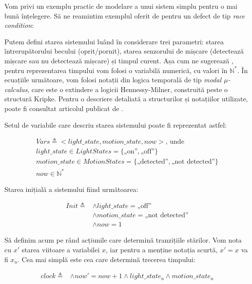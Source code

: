 Vom privi un exemplu practic de modelare a unui sistem simplu pentru o mai bună înțelegere. Să ne reamintim exemplul oferit de \citet{Zhou2021} pentru un defect de tip \textit{race condition}:


Putem defini starea sistemului luând în considerare trei parametri: starea întrerupătorului becului (oprit/pornit), starea senzorului de mișcare (detectează mișcare sau nu detectează mișcare) și timpul curent. Așa cum ne sugerează \citet{Lamport2005}, pentru reprezentarea timpului vom folosi o variabilă numerică, cu valori în $\mathbb{N}^*$. În ecuațiile următoare, vom folosi notații din logica temporală de tip \textit{modal $\mu$-calculus}, care este o extindere a logicii Hennessy-Milner, construită peste o structură Kripke. Pentru o descriere detaliată a structurilor și notațiilor utilizate, poate fi consultat articolul publicat de \citet{Markus1999}.

Setul de variabile care descriu starea sistemului poate fi reprezentat astfel:

\begin{gather*}
    Vars \triangleq <light\_state, motion\_state, now> \text{, unde } \\
        light\_state \in LightStates = \{\text{„on”}, \text{„off”}\} \\
        motion\_state \in MotionStates = \{\text{„detected”}, \text{„not detected”}\} \\
        now \in \mathbb{N}^*
\end{gather*}

Starea inițială a sistemului fiind următoarea:

\begin{align*}
    Init \triangleq &\wedge light\_state = \text{„off”} \\
                   &\wedge motion\_state = \text{„not detected”} \\
                   &\wedge now = 1
\end{align*}

Să definim acum pe rând acțiunile care determină tranzițiile stărilor. Vom nota cu $x'$ starea viitoare a variabilei $x$, iar pentru a menține notația scurtă, $x' = x$ va fi $x_u$. Cea mai simplă este cea care determină trecerea timpului:

\begin{align*}
    clock \triangleq &\wedge now' = now + 1 \wedge light\_state_u \wedge motion\_state_u
\end{align*}


